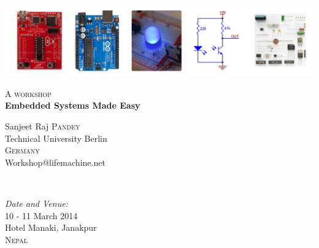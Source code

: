 \documentclass[12pt]{article} %
\begin{document}

\begin{titlepage}

\newcommand{\HRule}{\rule{\linewidth}{0.5mm}} %


  \begin{flushright}
    \includegraphics[width=1\textwidth]{banner}
  \end{flushright}

\vspace{30 mm}

\textsc{\large A workshop}\\ %

{ \huge \bfseries Embedded Systems Made Easy}\\[0.4cm] %

\begin{minipage}{0.4\textwidth}
\begin{flushleft}
Sanjeet Raj \textsc{Pandey}\\ 
Technical University Berlin\\ 
\textsc{Germany}\\ 
Workshop@lifemachine.net\\
\end{flushleft}
\end{minipage} \\[5cm]

\begin{minipage}{0.4\textwidth}
\begin{flushleft}
\emph{\large Date and Venue:}\\
\large 10 - 11 March 2014\\
Hotel Manaki, Janakpur\\ 
\textsc{Nepal}\\ 
\end{flushleft}
\end{minipage}

\vfill %

\end{titlepage}
\end{document}
